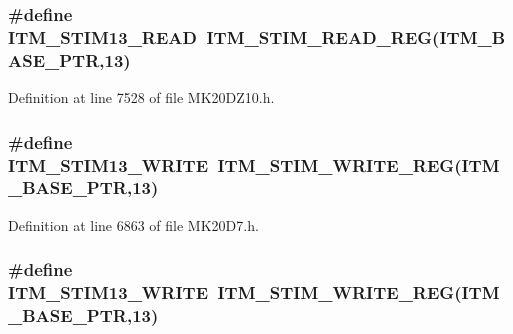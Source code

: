 \subsubsection[{\texorpdfstring{I\+T\+M\+\_\+\+S\+T\+I\+M13\+\_\+\+R\+E\+AD}{ITM_STIM13_READ}}]{\setlength{\rightskip}{0pt plus 5cm}\#define I\+T\+M\+\_\+\+S\+T\+I\+M13\+\_\+\+R\+E\+AD~{\bf I\+T\+M\+\_\+\+S\+T\+I\+M\+\_\+\+R\+E\+A\+D\+\_\+\+R\+EG}({\bf I\+T\+M\+\_\+\+B\+A\+S\+E\+\_\+\+P\+TR},13)}\hypertarget{group___i_t_m___register___accessor___macros_ga926c47eb7733a253885c7246858defa7}{}\label{group___i_t_m___register___accessor___macros_ga926c47eb7733a253885c7246858defa7}


Definition at line 7528 of file M\+K20\+D\+Z10.\+h.

\subsubsection[{\texorpdfstring{I\+T\+M\+\_\+\+S\+T\+I\+M13\+\_\+\+W\+R\+I\+TE}{ITM_STIM13_WRITE}}]{\setlength{\rightskip}{0pt plus 5cm}\#define I\+T\+M\+\_\+\+S\+T\+I\+M13\+\_\+\+W\+R\+I\+TE~{\bf I\+T\+M\+\_\+\+S\+T\+I\+M\+\_\+\+W\+R\+I\+T\+E\+\_\+\+R\+EG}({\bf I\+T\+M\+\_\+\+B\+A\+S\+E\+\_\+\+P\+TR},13)}\hypertarget{group___i_t_m___register___accessor___macros_gab8eddf17288ccf56195272767250b472}{}\label{group___i_t_m___register___accessor___macros_gab8eddf17288ccf56195272767250b472}


Definition at line 6863 of file M\+K20\+D7.\+h.

\subsubsection[{\texorpdfstring{I\+T\+M\+\_\+\+S\+T\+I\+M13\+\_\+\+W\+R\+I\+TE}{ITM_STIM13_WRITE}}]{\setlength{\rightskip}{0pt plus 5cm}\#define I\+T\+M\+\_\+\+S\+T\+I\+M13\+\_\+\+W\+R\+I\+TE~{\bf I\+T\+M\+\_\+\+S\+T\+I\+M\+\_\+\+W\+R\+I\+T\+E\+\_\+\+R\+EG}({\bf I\+T\+M\+\_\+\+B\+A\+S\+E\+\_\+\+P\+TR},13)}\hypertarget{group___i_t_m___register___accessor___macros_gab8eddf17288ccf56195272767250b472}{}\label{group___i_t_m___register___accessor___macros_gab8eddf17288ccf56195272767250b472}


